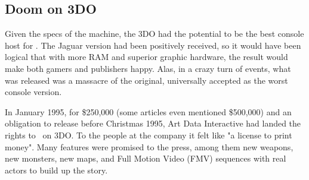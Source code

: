 \subsection{Doom on 3DO}
Given the specs of the machine, the 3DO had the potential to be the best console host for \doom. The Jaguar version had been positively received, so it would have been logical that with more RAM and superior graphic hardware, the result would make both gamers and publishers happy. Alas, in a crazy turn of events, what was released was a massacre of the original, universally accepted as the worst console version.\\  
\par
In January 1995, for \$250,000 (some articles even mentioned \$500,000) and an obligation to release before Christmas 1995, Art Data Interactive had landed the rights to \doom~on 3DO. To the people at the company it felt like "a license to print money". Many features were promised to the press, among them new weapons, new monsters, new maps, and Full Motion Video (FMV) sequences with real actors to build up the story.\\
\par
{}
\par


